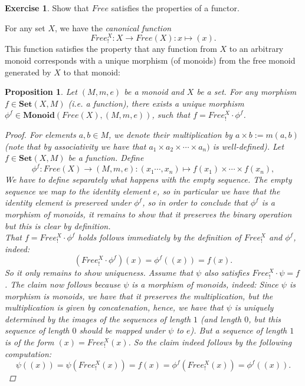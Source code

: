 \documentclass[a4paper,10pt]{scrartcl}
\theoremstyle{plain}
\newtheorem{prop}[thm]{Proposition}
\theoremstyle{definition}
\newtheorem{exer}[thm]{Exercise}
\newcommand{\Catb}[1]{\mathbf{#1}}
\newcommand{\SET}{\Catb{Set}}
\newcommand{\MON}{\Catb{Monoid}}
\newcommand{\CHom}[3]{{#1}(#2,#3)}
\newcommand{\Comp}{\cdot}
\begin{document}
\begin{exer} Show that $Free$ satisfies the properties of a functor.
\end{exer}

For any set $X$, we have the \textit{canonical function} 
\[
Free^{X}_{!}: X\to Free(X): x\mapsto (x).
\]
This function satisfies the property that any function from $X$ to an arbitrary monoid corresponds with a unique morphism (of monoids) from the free monoid generated by $X$ to that monoid:
\begin{prop}\label{prop:UVP_forget_montoset} Let $(M,m,e)$ be a monoid and $X$ be a set. For any morphism $f \in \CHom{\SET}{X}{M}$ (i.e. a function), there exists a unique  morphism $\phi^{f} \in \CHom{\MON}{Free(X)}{(M,m,e)}$, such that $f = Free^{X}_{!}\Comp \phi^{f}$.
\begin{proof}
For elements $a,b\in M$, we denote their multiplication by $a\times b := m(a,b)$ (note that by associativity we have that $a_1\times a_2\times\cdots\times a_n)$ is well-defined). Let $f\in \CHom{\SET}{X}{M}$ be a function. Define 
\[
\phi^{f}: Free(X)\to (M,m,e): (x_1\cdots,x_n)\mapsto f(x_1) \times\cdots \times f(x_n),
\] 
We have to define separately what happens with the empty sequence. The empty sequence we map to the identity element $e$, so in particular we have that the identity element is preserved under $\phi^{f}$, so in order to conclude that $\phi^{f}$ is a morphism of monoids, it remains to show that it preserves the binary operation but this is clear by definition.\\
That $f = Free^{X}_{!}\Comp \phi^{f}$ holds follows immediately by the definition of $Free^{X}_{!}$ and $\phi^{f}$, indeed:
\[
\left(Free^{X}_{!}\Comp \phi^{f}\right)(x) = \phi^{f}\left((x)\right) = f(x).
\]
So it only remains to show uniqueness. Assume that $\psi$ also satisfies $Free^{X}_{!}\Comp \psi = f$. The claim now follows because $\psi$ is a morphism of monoids, indeed: Since $\psi$ is morphism is monoids, we have that it preserves the multiplication, but the multiplication is given by concatenation, hence, we have that $\psi$ is uniquely determined by the images of the sequences of length $1$ (and length $0$, but this sequence of length $0$ should be mapped under $\psi$ to $e$). But a sequence of length $1$ is of the form $(x) = Free^{X}_{!}(x)$. So the claim indeed follows by the following computation: 
\[
\psi((x)) = \psi(Free^{X}_{!}(x)) = f(x) = \phi^{f}(Free^{X}_{!}(x)) = \phi^{f}((x)).
\]
\end{proof}
\end{prop}
\end{document}
